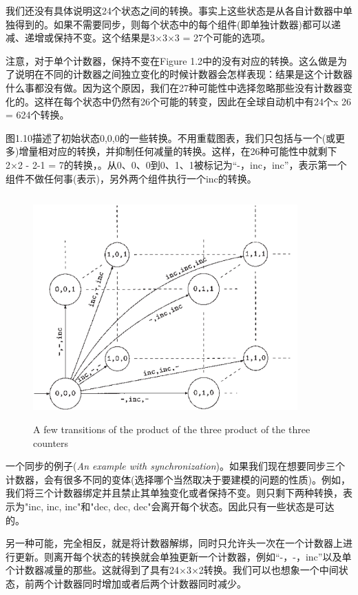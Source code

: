 \documentclass{book}
\begin{document}
    我们还没有具体说明这24个状态之间的转换。事实上这些状态是从各自计数器中单独得到的。如果不需要同步，则每个状态中的每个组件(即单独计数器)都可以递减、递增或保持不变。这个结果是3×3×3 = 27个可能的选项。
    
    注意，对于单个计数器，保持不变在Figure 1.2中的没有对应的转换。这么做是为了说明在不同的计数器之间独立变化的时候计数器会怎样表现：结果是这个计数器什么事都没有做。因为这个原因，我们在27种可能性中选择忽略那些没有计数器变化的。这样在每个状态中仍然有26个可能的转变，因此在全球自动机中有24个x 26 = 624个转换。
    
    图1.10描述了初始状态0,0,0的一些转换。不用重载图表，我们只包括与一个(或更多)增量相对应的转换，并抑制任何减量的转换。这样，在26种可能性中就剩下2×2 - 2-1 = 7的转换，。从0、0、0到0、1、1被标记为“-，inc，inc”，表示第一个组件不做任何事(表示)，另外两个组件执行一个inc的转换。
    \begin{figure}
    \centering
    \includegraphics[height=3.4in,width=4.0in]{1_10.png}
    \caption{A few transitions of the product of the three product of the three counters}
    \end{figure}
    
    一个同步的例子({\itshape An example with synchronization})。如果我们现在想要同步三个计数器，会有很多不同的变体(选择哪个当然取决于要建模的问题的性质)。例如，我们将三个计数器绑定并且禁止其单独变化或者保持不变。则只剩下两种转换，表示为"inc, inc, inc"和"dec, dec, dec"会离开每个状态。因此只有一些状态是可达的。
    
    另一种可能，完全相反，就是将计数器解绑，同时只允许头一次在一个计数器上进行更新。则离开每个状态的转换就会单独更新一个计数器，例如“-，-，inc”以及单个计数器减量的那些。这就得到了具有24×3×2转换。我们可以也想象一个中间状态，前两个计数器同时增加或者后两个计数器同时减少。
    
\end{document}
